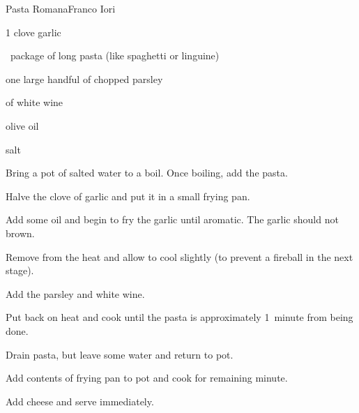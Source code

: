 \begin{recipe}{Pasta Romana}{Franco Iori}{}

\begin{ingredients}
\item 1 clove garlic
\item \half{}~package of long pasta (like spaghetti or linguine)
\item one large handful of chopped parsley
\item \C{\half} of white wine
\item olive oil
\item salt
\item {}
\end{ingredients}

\begin{directions}
\item Bring a pot of salted water to a boil. Once boiling, add the pasta.
\item Halve the clove of garlic and put it in a small frying pan.
\item Add some oil and begin to fry the garlic until aromatic. The garlic should not brown.
\item Remove from the heat and allow to cool slightly (to prevent a fireball in the next stage).
\item Add the parsley and white wine.
\item Put back on heat and cook until the pasta is approximately 1~minute from being done.
\item Drain pasta, but leave some water and return to pot.
\item Add contents of frying pan to pot and cook for remaining minute.
\item Add cheese and serve immediately.
\end{directions}

\end{recipe}
